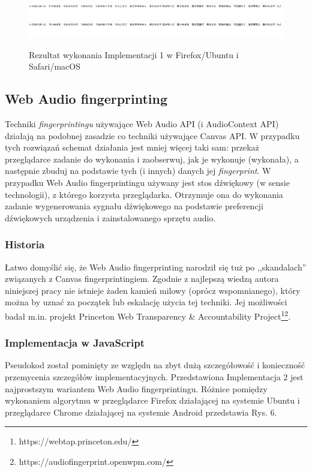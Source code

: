 \begin{figure}
	\includegraphics[trim={0 121px 2269px 0},clip,frame]{img/06}
	\includegraphics[trim={0 121px 2269px 0},clip,frame]{img/07}
	\caption{Rezultat wykonania Implementacji 1 w Firefox/Ubuntu i Safari/macOS}
\end{figure}

\subsection{Web Audio fingerprinting}
Techniki \emph{fingerprintingu} używające Web Audio API (i AudioContext API)
działają na podobnej zasadzie co techniki używające Canvas API. W przypadku tych
rozwiązań schemat działania jest mniej więcej taki sam: przekaż przeglądarce
zadanie do wykonania i zaobserwuj, jak je wykonuje (wykonała), a następnie
zbuduj na podstawie tych (i innych) danych jej \emph{fingerprint}. W przypadku
Web Audio fingerprintingu używany jest stos dźwiękowy (w sensie technologii), z
którego korzysta przeglądarka. Otrzymuje ona do wykonania zadanie wygenerowania
sygnału dźwiękowego na podstawie preferencji dźwiękowych urządzenia i
zainstalowanego sprzętu audio.

\subsubsection{Historia}
Łatwo domyślić się, że Web Audio fingerprinting narodził się tuż po
,,skandalach'' związanych z Canvas fingerprintingiem. Zgodnie z najlepszą wiedzą
autora niniejszej pracy nie istnieje żaden kamień milowy (oprócz wspomnianego),
który można by uznać za początek lub eskalację użycia tej techniki. Jej
możliwości badał m.in. projekt Princeton Web Transparency \& Accountability
Project\footnote{https://webtap.princeton.edu/}\footnote{https://audiofingerprint.openwpm.com/}.

\subsubsection{Implementacja w JavaScript}
Pseudokod został pominięty ze względu na zbyt dużą szczegółowość i konieczność
przemycenia szczegółów implementacyjnych. Przedstawiona Implementacja 2 jest
najprostszym wariantem Web Audio fingerprintingu. Różnice pomiędzy wykonaniem
algorytmu w przeglądarce Firefox działającej na systemie Ubuntu i przeglądarce
Chrome działającej na systemie Android przedstawia Rys. 6.

